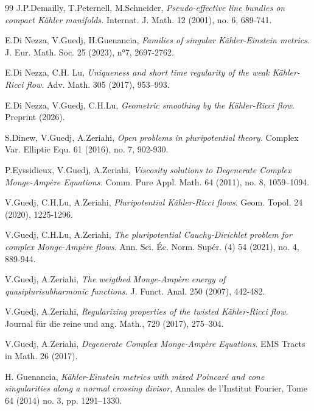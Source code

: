\documentclass[11pt]{amsart}
\numberwithin{equation}{section}
\begin{document}
\begin{thebibliography}{99}
 J.P.Demailly, T.Peternell, M.Schneider,
{\em Pseudo-effective line bundles on compact K\"ahler manifolds.}
 Internat. J. Math. 12 (2001), no. 6, 689-741. 
 


 
   E.Di Nezza, V.Guedj, H.Guenancia, 
  {\em Families of singular K\"ahler-Einstein metrics.}
  J. Eur. Math. Soc. 25 (2023), n°7, 2697-2762.
 

 
   E.Di Nezza, C.H. Lu,  
  {\em Uniqueness and short time regularity of the weak K\"ahler-Ricci flow.}
  Adv. Math. { 305} (2017), 953--993.
  
    E.Di Nezza, V.Guedj, C.H.Lu,  
  {\em Geometric smoothing by the K\"ahler-Ricci flow}.
  Preprint (2026).
 

 
   S.Dinew, V.Guedj, A.Zeriahi, 
  {\em Open problems in pluripotential theory.}
   Complex Var. Elliptic Equ. 61 (2016), no. 7, 902-930. 
   
     P.Eyssidieux, V.Guedj, A.Zeriahi, 
   {\em Viscosity solutions to Degenerate Complex Monge-Amp\`ere Equations.} 
  Comm. Pure Appl. Math.  { 64}  (2011),  no. 8, 1059--1094. 
 
 
 
    V.Guedj, C.H.Lu, A.Zeriahi,  
  {\em Pluripotential K\"ahler-Ricci flows}. 
 Geom. Topol. 24 (2020), 1225-1296.
  

   V.Guedj, C.H.Lu, A.Zeriahi,  
  {\em The pluripotential Cauchy-Dirichlet problem for complex Monge-Amp\`ere flows}. 
  Ann. Sci. \'Ec. Norm. Sup\'er. (4) 54 (2021), no. 4, 889-944.
  
  
  V.Guedj, A.Zeriahi,   
{\em The weigthed Monge-Amp\`ere energy of quasiplurisubharmonic functions.}
J. Funct. Anal. 250 (2007), 442-482.

 V.Guedj, A.Zeriahi,   
{\em Regularizing properties of the twisted K\"ahler-Ricci flow.} 
Journal f\"ur die reine und ang. Math., { 729} (2017), 275--304. 


 V.Guedj, A.Zeriahi,  
{\em Degenerate Complex Monge-Amp\`ere Equations}. 
EMS Tracts in Math. { 26} (2017).

 H. Guenancia, {\it K\"ahler-Einstein metrics with mixed Poincar\'e and cone singularities along a normal crossing divisor}, Annales de l'Institut Fourier, Tome 64 (2014) no. 3, pp. 1291--1330.


\end{thebibliography}
\end{document}
